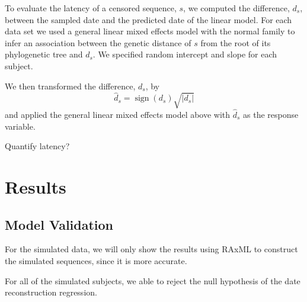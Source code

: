 \documentclass[12pt]{article}
\begin{document}
To evaluate the latency of a censored sequence, $s$, we computed the difference, $d_s$, between the sampled date and the predicted date of the linear model. For each data set we used a general linear mixed effects model with the normal family to infer an association between the genetic distance of $s$ from the root of its phylogenetic tree and $d_s$. We specified random intercept and slope for each subject.

We then transformed the difference, $d_s$, by
\[\hat{d}_s = \operatorname{sign}(d_s)\sqrt{|d_s|}\]
and applied the general linear mixed effects model above with $\hat{d}_s$ as the response variable.

Quantify latency?

\section * {Results} \label{sec:results}


\subsection * {Model Validation} \label{sec:sim_results}
For the simulated data, we will only show the results using RAxML to construct the simulated sequences, since it is more accurate.

For all of the simulated subjects, we able to reject the null hypothesis of the date reconstruction regression.

\end{document}
